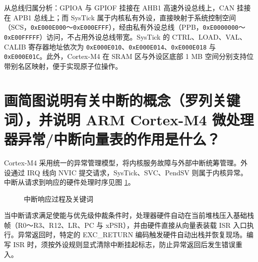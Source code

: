 \documentclass[UTF8,a4paper,zihao=5,fontset=none]{ctexart}
\newcommand{\hex}[1]{\texttt{0x#1}}
\begin{document}
从总线归属分析：GPIOA 与 GPIOF 挂接在 AHB1 高速外设总线上，CAN 挂接在 APB1 总线上；而 SysTick 属于内核私有外设，直接映射于系统控制空间（SCS，\hex{E000E000}～\hex{E000EFFF}），经由私有外设总线（PPB，\hex{E0000000}～\hex{E00FFFFF}）访问，不占用外设总线带宽。SysTick 的 CTRL、LOAD、VAL、CALIB 寄存器地址依次为 \hex{E000E010}、\hex{E000E014}、\hex{E000E018} 与 \hex{E000E01C}。此外，Cortex-M4 在 SRAM 区与外设区底部 1 MB 空间分别支持位带别名区映射，便于实现原子位操作。

\clearpage
\section{画简图说明有关中断的概念（罗列关键词），并说明 ARM Cortex-M4 微处理器异常/中断向量表的作用是什么？}

Cortex-M4 采用统一的异常管理模型，将内核服务故障与外部中断统筹管理。外设通过 IRQ 线向 NVIC 提交请求，SysTick、SVC、PendSV 则属于内核异常。中断从请求到响应的硬件处理时序见图 \ref{fig:interrupt}。

\begin{figure}[!ht]
\centering
{}
\caption{中断响应过程及关键词}
\label{fig:interrupt}
\end{figure}

当中断请求满足使能与优先级仲裁条件时，处理器硬件自动在当前堆栈压入基础栈帧（R0～R3、R12、LR、PC 与 xPSR），并由硬件直接从向量表装载 ISR 入口执行。异常返回时，特定的 EXC\_RETURN 编码触发硬件自动出栈并恢复现场。编写 ISR 时，须按外设规则显式清除中断挂起标志，防止异常返回后发生错误重入。
\end{document}
